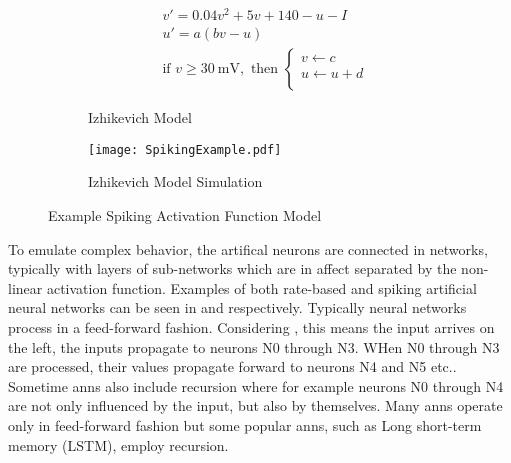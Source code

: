 \begin{figure}
\centering
\captionsetup{justification=centering}
\vspace{0.5cm}
\begin{subfigure}{.9\textwidth}
  \centering
  \begin{equation}
    \begin{split}
    &v' = 0.04v^2+5v + 140 - u - I\\
    &u' = a(bv-u)  \\
    &\text{if } v\ge  \SI{30}{\mV}, \text{ then } 
    \begin{cases}
        v \leftarrow c\\           
        u \leftarrow u+d\\           
    \end{cases} \nonumber
    \end{split}
  \end{equation}
  \caption{Izhikevich Model\cite{Iz2005}}
  \label{fig:Izhikevich Model}
  \end{subfigure}
\begin{subfigure}{.7\textwidth}
  \centering
  \mbox{\texttt{[image: SpikingExample.pdf]}}
  \captionsetup{justification=centering, skip=3pt}
  \caption{Izhikevich Model Simulation \cite{Iz2005}\cite{carnevale2006neuron}}
  \label{fig:spiking example}
\end{subfigure}
\caption{Example Spiking Activation Function Model}
\label{fig:Example Spiking Model}
\end{figure}

To emulate complex behavior, the artifical neurons are connected in networks, typically with layers of sub-networks which are in affect separated by the non-linear activation function.
Examples of both rate-based and spiking artificial neural networks can be seen in  and  respectively.
Typically neural networks process in a feed-forward fashion. Considering , this means the input arrives on the left, the inputs propagate to neurons N0 through N3. WHen N0 through N3 are processed, their values propagate forward to neurons N4 and N5 etc.. Sometime \ac{ann}s also include recursion where for example neurons N0 through N4 are not only influenced
by the input, but also by themselves. Many \ac{ann}s operate only in feed-forward fashion but some popular \ac{ann}s, such as Long short-term memory (LSTM), employ recursion.

